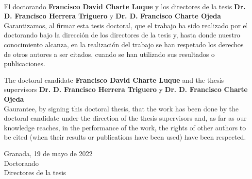 \clearpage
~
\vspace{5cm}

El doctorando \textbf{Francisco David Charte Luque} y los directores de la tesis \textbf{Dr. D. Francisco Herrera Triguero} y \textbf{Dr. D. Francisco Charte Ojeda}\\Garantizamos, al firmar esta tesis doctoral, que el trabajo ha sido realizado por el doctorando bajo la dirección de los directores de la tesis y, hasta donde nuestro conocimiento alcanza, en la realización del trabajo se han respetado los derechos de otros autores a ser citados, cuando se han utilizado sus resultados o publicaciones.

\vspace{1cm}
The doctoral candidate \textbf{Francisco David Charte Luque} and the thesis supervisors \textbf{Dr. D. Francisco Herrera Triguero} y \textbf{Dr. D. Francisco Charte Ojeda}\\Gaurantee, by signing this doctoral thesis, that the work has been done by the doctoral candidate under the direction of the thesis supervisors and, as far as our knowledge reaches, in the performance of the work, the rights of other authors to be cited (when their results or publications have been used) have been respected.
\vspace{1cm}

\begin{center}
    Granada, 19 de mayo de 2022\\\vspace{1em}
    Doctorando\\
    \vspace{3cm}
    Directores de la tesis
\end{center}
\clearpage